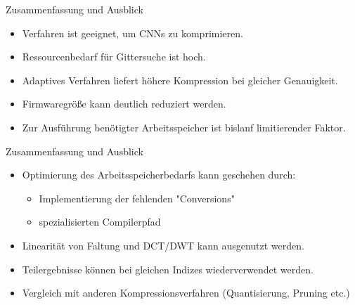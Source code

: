 \documentclass[aspectratio=169, 12pt]{beamer}
\begin{document}
\begin{frame}{Zusammenfassung und Ausblick}
  \begin{itemize}
    \item Verfahren ist geeignet, um CNNs zu komprimieren.
    \item Ressourcenbedarf für Gittersuche ist hoch.
    \item Adaptives Verfahren liefert höhere Kompression bei gleicher Genauigkeit.
    \item Firmwaregröße kann deutlich reduziert werden.
    \item Zur Ausführung benötigter Arbeitsspeicher ist bislanf limitierender Faktor.
  \end{itemize}
  
\end{frame}

\begin{frame}{Zusammenfassung und Ausblick}
  \begin{itemize}
    \item Optimierung des Arbeitsspeicherbedarfs kann geschehen durch:
    \begin{itemize}
      \item Implementierung der fehlenden "Conversions"
      \item spezialisierten Compilerpfad
    \end{itemize}
    \item Linearität von Faltung und DCT/DWT kann ausgenutzt werden.
    \item Teilergebnisse können bei gleichen Indizes wiederverwendet werden.
    \item Vergleich mit anderen Kompressionsverfahren (Quantisierung, Pruning etc.)
  \end{itemize}
\end{frame}

\end{document}
